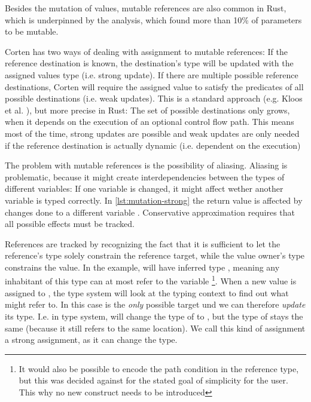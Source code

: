 \documentclass[twoside, english, final]{sdqthesis}
\theoremstyle{definition}
\begin{document}
Besides the mutation of values, mutable references are also common in Rust, which is underpinned by the analysis, which found more than 10\% of parameters to be mutable.

Corten has two ways of dealing with assignment to mutable references: If the reference destination is known, the destination's type will be updated with the assigned values type (i.e. strong update). If there are multiple possible reference destinations, Corten will require the assigned value to satisfy the predicates of all possible destinations (i.e. weak updates). This is a standard approach (e.g. Kloos et al. \cite{kloos_asynchronous_2015}), but more precise in Rust: The set of possible destinations only grows, when it depends on the execution of an optional control flow path. This means most of the time, strong updates are possible and weak updates are only needed if the reference destination is actually dynamic (i.e. dependent on the execution) 

The problem with mutable references is the possibility of aliasing. Aliasing is problematic, because it might create interdependencies between the types of different variables: If one variable is changed, it might affect wether another variable is typed correctly. In \cref{lst:mutation-strong} the return value  is affected by changes done to a different variable . Conservative approximation requires that all possible effects must be tracked. 


References are tracked by recognizing the fact that it is sufficient to let the reference's type solely constrain the reference target, while the value owner's type constrains the value.
In the example,  will have inferred type , meaning any inhabitant of this type can at most refer to the variable \footnote{It would also be possible to encode the path condition in the reference type, but this was decided against for the stated goal of simplicity for the user. This why no new construct needs to be introduced}.
When a new value is assigned to , the type system will look at the typing context to find out what  might refer to. In this case  is the \textit{only} possible target und we can therefore \textit{update} its type. I.e. in type system,  will change the type of  to , but the type of  stays the same (because it still refers to the same location). We call this kind of assignment a strong assignment, as it can change the type.
\end{document}
